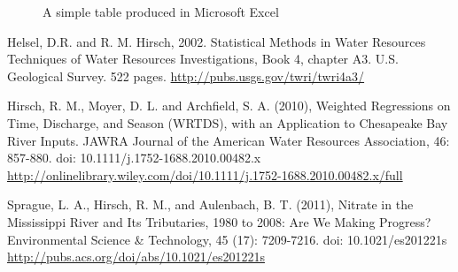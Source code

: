 \documentclass[a4paper,11pt]{article}\usepackage[]{graphicx}\usepackage[]{color}
\begin{document}
\begin{figure}[ht!]
\centering
\caption{A simple table produced in Microsoft Excel}
\label{overflow}
\end{figure}

\clearpage

\begin{thebibliography}{10}

Helsel, D.R. and R. M. Hirsch, 2002. Statistical Methods in Water Resources Techniques of Water Resources Investigations, Book 4, chapter A3. U.S. Geological Survey. 522 pages. \url{http://pubs.usgs.gov/twri/twri4a3/}

Hirsch, R. M., Moyer, D. L. and Archfield, S. A. (2010), Weighted Regressions on Time, Discharge, and Season (WRTDS), with an Application to Chesapeake Bay River Inputs. JAWRA Journal of the American Water Resources Association, 46: 857-880. doi: 10.1111/j.1752-1688.2010.00482.x \url{http://onlinelibrary.wiley.com/doi/10.1111/j.1752-1688.2010.00482.x/full}

Sprague, L. A., Hirsch, R. M., and Aulenbach, B. T. (2011), Nitrate in the Mississippi River and Its Tributaries, 1980 to 2008: Are We Making Progress? Environmental Science \& Technology, 45 (17): 7209-7216. doi: 10.1021/es201221s \url{http://pubs.acs.org/doi/abs/10.1021/es201221s}

\end{thebibliography}
\end{document}
